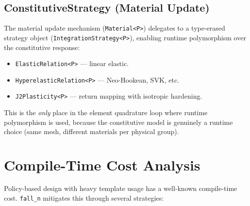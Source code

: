 \subsection{ConstitutiveStrategy (Material Update)}

The material update mechanism (\texttt{Material<P>}) delegates to a
type-erased strategy object (\texttt{IntegrationStrategy<P>}), enabling
runtime polymorphism over the constitutive response:
\begin{itemize}[nosep]
  \item \texttt{ElasticRelation<P>} --- linear elastic.
  \item \texttt{HyperelasticRelation<P>} --- Neo-Hookean, SVK, etc.
  \item \texttt{J2Plasticity<P>} --- return mapping with isotropic hardening.
\end{itemize}
This is the \emph{only} place in the element quadrature loop where runtime
polymorphism is used, because the constitutive model is genuinely a runtime
choice (same mesh, different materials per physical group).


\section{Compile-Time Cost Analysis}
\label{sec:compile_time}

Policy-based design with heavy template usage has a well-known compile-time
cost.  \texttt{fall\_n} mitigates this through several strategies:

